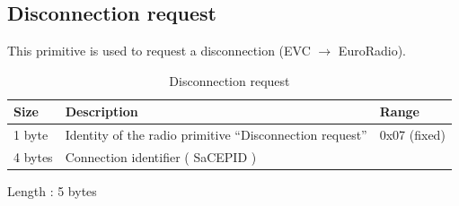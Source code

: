 \documentclass[nocc]{template/openetcs_report}
\begin{document}
\subsection{Disconnection request}
This primitive is used to request a disconnection (EVC $\rightarrow$ EuroRadio).
 			\begin{longtable}{|l|l|l|}
				\caption{Disconnection request}\\ 
				\hline
				
					\begin{minipage}[t]{0.1\linewidth} \textbf{Size}	\end{minipage}
				&	\begin{minipage}[t]{0.5\linewidth} \textbf{Description}	\end{minipage}
				&	\begin{minipage}[t]{0.3\linewidth} \textbf{Range} \end{minipage} \\
				
				\hline
					 \begin{minipage}[t]{0.1\linewidth}1 byte \end{minipage}
					&\begin{minipage}[t]{0.6\linewidth}Identity of the radio primitive "`Disconnection request"'	\end{minipage}
					&\begin{minipage}[t]{0.3\linewidth}0x07 (fixed) \end{minipage} \\
					
				\hline
					 \begin{minipage}[t]{0.1\linewidth}4 bytes \end{minipage}
					&\begin{minipage}[t]{0.6\linewidth}Connection identifier ( SaCEPID )	\end{minipage}
					&\begin{minipage}[t]{0.3\linewidth} \end{minipage} \\
					
				\hline
			\end{longtable}
			Length : 5 bytes
\end{document}
